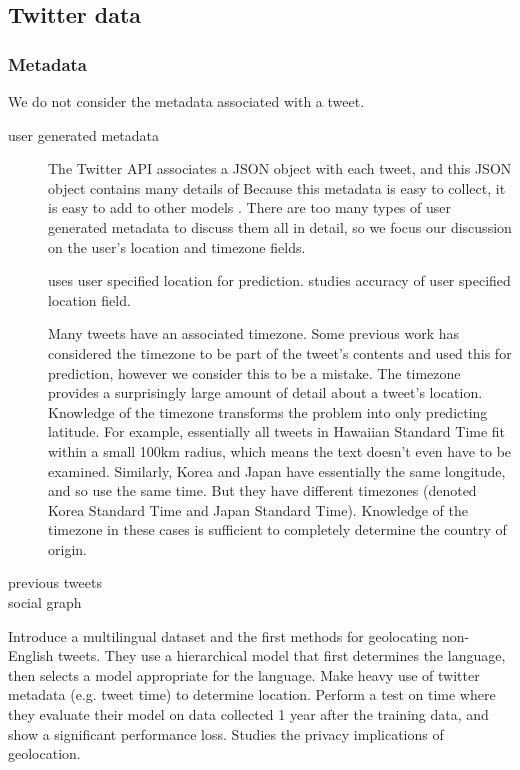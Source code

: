 \documentclass{article}
\begin{document}
\subsection{Twitter data}

\subsubsection{Metadata}

We do not consider the metadata associated with a tweet. 

\begin{description}
    \item[user generated metadata] 
        The Twitter API associates a JSON object with each tweet,
        and this JSON object contains many details of
        Because this metadata is easy to collect,
        it is easy to add to other models \citep{han2014text}.
        There are too many types of user generated metadata to discuss them all in detail,
        so we focus our discussion on the user's location and timezone fields.

        \citet{schulz2013multi} uses user specified location for prediction.
        \citet{hecht2011tweets} studies accuracy of user specified location field.

        Many tweets have an associated timezone.
        Some previous work \citep{schulz2013multi,han2014text} has considered the timezone to be part of the tweet's contents and used this for prediction,
        however we consider this to be a mistake.
        The timezone provides a surprisingly large amount of detail about a tweet's location.
        Knowledge of the timezone transforms the problem into only predicting latitude.
        For example, essentially all tweets in Hawaiian Standard Time fit within a small 100km radius, which means the text doesn't even have to be examined.
        Similarly, Korea and Japan have essentially the same longitude, and so use the same time.
        But they have different timezones (denoted Korea Standard Time and Japan Standard Time).
        Knowledge of the timezone in these cases is sufficient to completely determine the country of origin.
        
    \item[previous tweets]
    \item[social graph]
\end{description}

Introduce a multilingual dataset and the first methods for geolocating non-English tweets.
They use a hierarchical model that first determines the language,
then selects a model appropriate for the language.
Make heavy use of twitter metadata (e.g. tweet time) to determine location.
Perform a test on time where they evaluate their model on data collected 1 year after the training data, and show a significant performance loss.
Studies the privacy implications of geolocation.
\end{document}

